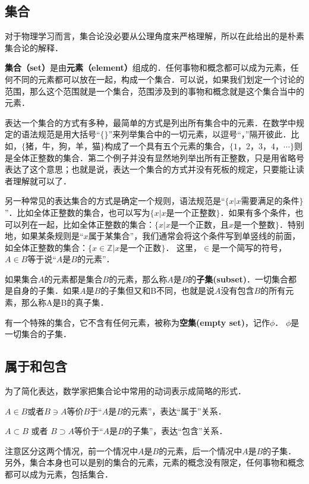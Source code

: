 \subsection{集合}

对于物理学习而言，集合论没必要从公理角度来严格理解，所以在此给出的是朴素集合论的解释．

\textbf{集合（set）}是由\textbf{元素（element）}组成的．任何事物和概念都可以成为元素，任何不同的元素都可以放在一起，构成一个集合．可以说，如果我们划定一个讨论的范围，那么这个范围就是一个集合，范围涉及到的事物和概念就是这个集合当中的元素．

表达一个集合的方式有多种，最简单的方式是列出所有集合中的元素．在数学中规定的语法规范是用大括号“$\{\}$”来列举集合中的一切元素，以逗号“，”隔开彼此．比如，$\{$猪，牛，狗，羊，猫$\}$构成了一个具有五个元素的集合，$\{1，2，3，4，⋯\}$则是全体正整数的集合．第二个例子并没有显然地列举出所有正整数，只是用省略号表达了这个意思；也就是说，表达一个集合的方式并没有死板的规定，只要能让读者理解就可以了．

另一种常见的表达集合的方式是确定一个规则，语法规范是“$\{$$x|x$需要满足的条件$\}$”．比如全体正整数的集合，也可以写为$\{$$x|x$是一个正整数$\}$．如果有多个条件，也可以列在一起，比如全体正整数的集合：$\{$$x|x$是一个正数，且$x$是一个整数$\}$．特别地，如果某条规则是“$x$属于某集合”，我们通常会将这个条件写到单竖线的前面，如全体正整数的集合：$\{$$x∈\mathbb{Z}|x$是一个正数$\}$． 这里，$∈$是一个简写的符号，$A∈ B$等于说“$A$是$B$的元素”．

如果集合$A$的元素都是集合$B$的元素，那么称$A$是$B$的\textbf{子集(subset)}．一切集合都是自身的子集．如果$A$是$B$的子集但又和B不同，也就是说$A$没有包含$B$的所有元素，那么称A是B的真子集．

有一个特殊的集合，它不含有任何元素，被称为\textbf{空集(empty set)}，记作$\phi$． $\phi $是一切集合的子集．

\subsection{属于和包含}
为了简化表达，数学家把集合论中常用的动词表示成简略的形式．

$A∈B$或者$B\ni A$等价$B$于“$A$是$B$的元素”，表达“属于”关系． 

$A⊂B$ 或者 $B⊃ A$等价于“$A$是$B$的子集”，表达“包含”关系． 

注意区分这两个情况，前一个情况中$A$是$B$的元素，后一个情况中$A$是$B$的子集．另外，集合本身也可以是别的集合的元素，元素的概念没有限定，任何事物和概念都可以成为元素，包括集合．

